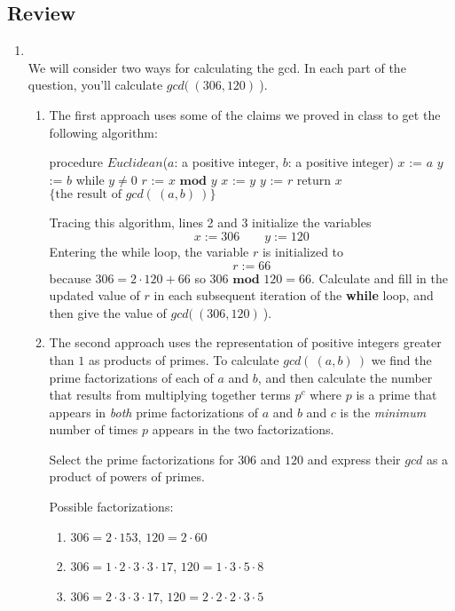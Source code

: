 \documentclass[12pt, oneside]{article}
\begin{document}
\subsection*{Review}
\begin{enumerate}
\item \hspace{1in}\\ 

We will consider two ways for calculating the gcd. In each 
part of the question, you'll calculate $gcd(~(306, 120)~$).

\begin{enumerate}
\item The first approach uses some of the claims we proved in class
to get the following algorithm:


\begin{algorithm}[caption={Euclidean algorithm for calculating greatest common divisor}]
    procedure $\textit{Euclidean}$($a$: a positive integer, $b$: a positive integer)
    $x$ := $a$
    $y$ := $b$
    while $y \neq 0$
      $r$ := $x \textbf{ mod } y$
      $x$ := $y$
      $y$ := $r$
    return $x$ $\{ \textrm{the result of } gcd(~(a,b)~)\} $
\end{algorithm} 
Tracing this algorithm, lines 2 and 3 initialize the variables 
\[
    x:= 306 \qquad y:=120
\]
Entering the while loop, the variable $r$ is initialized to
\[
    r:= 66
\]
because $306 = 2 \cdot 120 + 66$ so $306 \textbf{ mod } 120 = 66$.
Calculate and fill in the updated value of $r$ in each subsequent iteration
of the {\bf while} loop, and then give the value of $gcd(~(306, 120)~$).

\item The second approach uses the representation of positive integers
greater than $1$ as products of primes. To calculate $gcd(~(a,b)~)$ we 
find the prime factorizations of each of $a$ and $b$, and then calculate
the number that results from multiplying together terms $p^c$ where $p$ is 
a prime that appears in {\it both} prime factorizations of $a$ and $b$
and $c$ is the {\it minimum} number of times $p$ appears in the two factorizations.

Select the prime factorizations for $306$ and $120$ and express their 
$gcd$ as a product of powers of primes.

Possible factorizations:
\begin{enumerate}
        \item $306 = 2 \cdot 153$, $120 = 2 \cdot 60$
        \item $306 = 1 \cdot 2 \cdot 3 \cdot 3 \cdot 17$, $120 = 1 \cdot 3 \cdot 5 \cdot 8$
        \item $306 = 2 \cdot 3 \cdot 3 \cdot 17$, $120 = 2 \cdot 2 \cdot 2 \cdot 3 \cdot 5$
\end{enumerate}


\end{enumerate}
\end{enumerate}
\end{document}
